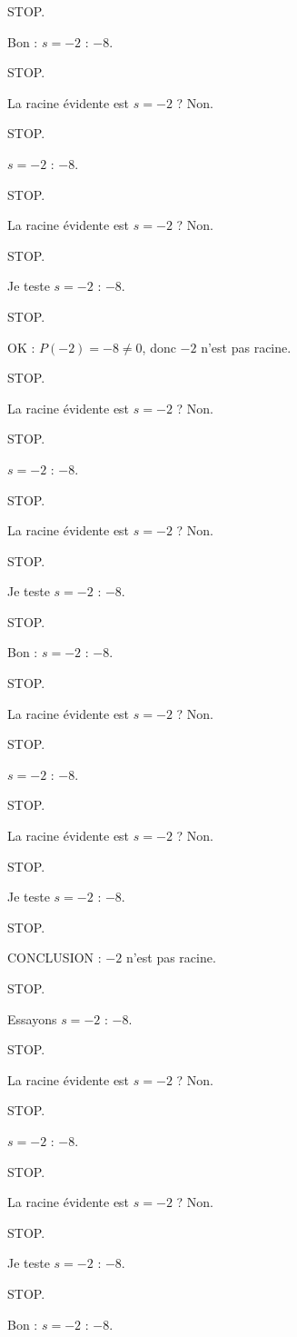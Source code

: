 \documentclass[11pt]{article}
\begin{document}
\begin{exoresolu}
\begin{enumerate}
STOP. 

Bon : $s = -2$ : $-8$. 

STOP. 

La racine évidente est $s = -2$ ? Non. 

STOP. 

$s = -2$ : $-8$. 

STOP. 

La racine évidente est $s = -2$ ? Non. 

STOP. 

Je teste $s = -2$ : $-8$. 

STOP. 

OK : $P(-2) = -8 \neq 0$, donc $-2$ n'est pas racine. 

STOP. 

La racine évidente est $s = -2$ ? Non. 

STOP. 

$s = -2$ : $-8$. 

STOP. 

La racine évidente est $s = -2$ ? Non. 

STOP. 

Je teste $s = -2$ : $-8$. 

STOP. 

Bon : $s = -2$ : $-8$. 

STOP. 

La racine évidente est $s = -2$ ? Non. 

STOP. 

$s = -2$ : $-8$. 

STOP. 

La racine évidente est $s = -2$ ? Non. 

STOP. 

Je teste $s = -2$ : $-8$. 

STOP. 

CONCLUSION : $-2$ n'est pas racine. 

STOP. 

Essayons $s = -2$ : $-8$. 

STOP. 

La racine évidente est $s = -2$ ? Non. 

STOP. 

$s = -2$ : $-8$. 

STOP. 

La racine évidente est $s = -2$ ? Non. 

STOP. 

Je teste $s = -2$ : $-8$. 

STOP. 

Bon : $s = -2$ : $-8$. 


\end{enumerate}
\end{exoresolu}
\end{document}
